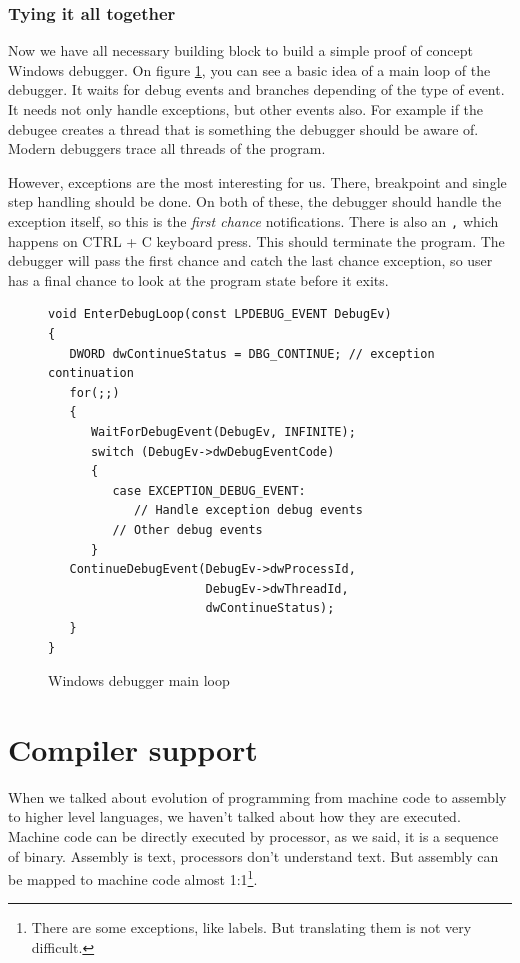 \subsubsection*{Tying it all together}
Now we have all necessary building block to build a simple proof of concept
Windows debugger. On figure \ref{fig:windows-debugger-mainloop}, you can see a
basic idea of a main loop of the debugger. It waits for debug events and
branches depending of the type of event. It needs not only handle exceptions,
but other events also. For example if the debugee creates a thread that is
something the debugger should be aware of. Modern debuggers trace all threads
of the program.

 However,
exceptions are the most interesting for us. There, breakpoint and single step
handling should be done. On both of these, the debugger should handle the
exception itself, so this is the \textit{first chance} notifications. There is
also an \texttt, which happens on CTRL + C keyboard press.
This should terminate the program. The debugger will pass the first chance and
catch the last chance exception, so user has a final chance to look at the
program state before it exits.

\begin{figure}
    \begin{verbatim}
void EnterDebugLoop(const LPDEBUG_EVENT DebugEv)
{
   DWORD dwContinueStatus = DBG_CONTINUE; // exception continuation
   for(;;)
   {
      WaitForDebugEvent(DebugEv, INFINITE);
      switch (DebugEv->dwDebugEventCode)
      {
         case EXCEPTION_DEBUG_EVENT:
            // Handle exception debug events
         // Other debug events
      }
   ContinueDebugEvent(DebugEv->dwProcessId,
                      DebugEv->dwThreadId,
                      dwContinueStatus);
   }
}
\end{verbatim}
\caption{Windows debugger main loop}
\label{fig:windows-debugger-mainloop}
\end{figure}

\section{Compiler support}
When we talked about evolution of programming from machine code to assembly to
higher level languages, we haven't talked about how they are executed. Machine
code can be directly executed by processor, as we said, it is a sequence of
binary. Assembly is text, processors don't understand text. But assembly can be
mapped to machine code almost 1:1\footnote{There are some exceptions, like
labels. But translating them is not very difficult.}.

